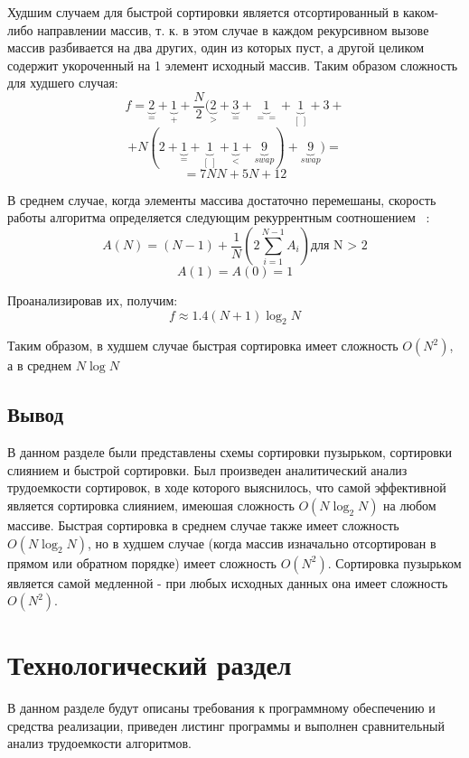 \documentclass[a4paper,12pt]{article}
\begin{document}
		Худшим случаем для быстрой сортировки является отсортированный в каком-либо направлении массив, т. к. в этом случае в каждом рекурсивном вызове массив разбивается на два других, один из которых пуст, а другой целиком содержит укороченный на 1 элемент исходный массив. Таким образом сложность для худшего случая:
		\[
		f = \underbrace{2}_{=} + \underbrace{1}_{+} + \frac{N}{2}(\underbrace{2}_{>} + \underbrace{3}_{=} + \underbrace{1}_{==} + \underbrace{1}_{[\:]} + 3 + \]
		\[ + N(2 + \underbrace{1}_{=} + \underbrace{1}_{[\:]} + \underbrace{1}_{<}+ \underbrace{9}_{swap}) + \underbrace{9}_{swap}) =
		\]
		\[
		 = 7NN + 5N + 12
		\]
		
		В среднем случае, когда элементы массива достаточно перемешаны, скорость работы алгоритма определяется следующим рекуррентным соотношением ~\cite{makkonell}:
		\[
		A(N) = (N - 1) + \frac{1}{N} \left( 2\sum_{i=1}^{N - 1}A_i\right)  \text {для N > 2}
		\]
		\[
		A(1) = A(0) = 1
		\]
		
		Проанализировав их, получим:
		\[
		f \approx 1.4(N + 1) \log_2 N
		\]
		
		Таким образом, в худшем случае быстрая сортировка имеет сложность $O(N^2)$, а в среднем $N \log N$

	    
	\subsection*{Вывод}
		В данном разделе были представлены схемы сортировки пузырьком, сортировки слиянием и быстрой сортировки.
			Был произведен аналитический анализ трудоемкости сортировок, в ходе которого выяснилось, что самой эффективной является сортировка слиянием, имеюшая сложность $O(N\log_2 N)$ на любом массиве. Быстрая сортировка в среднем случае также имеет сложность $O(N\log_2 N)$, но в худшем случае (когда массив изначально отсортирован в прямом или обратном порядке) имеет сложность $O(N^2)$. Сортировка пузырьком является самой медленной - при любых исходных данных она имеет сложность $O(N^2)$. 


  
\pagebreak
\newpage         

\section{Технологический раздел}

	В данном разделе будут описаны требования к программному обеспечению и средства реализации, приведен листинг программы и выполнен сравнительный анализ трудоемкости алгоритмов.
\end{document}
